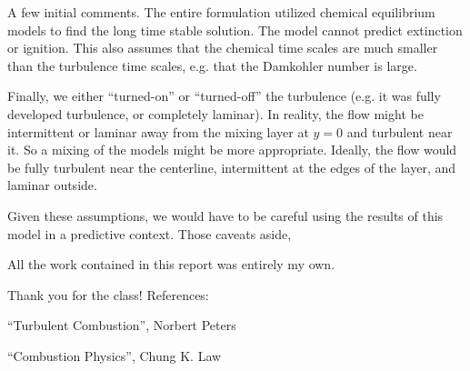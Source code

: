 \documentclass{article}
\begin{document}
A few initial comments. The entire formulation utilized chemical equilibrium models 
to find the long time stable solution. The model cannot predict extinction or ignition. 
This also assumes that the chemical time scales are much smaller than the turbulence 
time scales, e.g. that the Damkohler number is large. 

Finally, we either ``turned-on'' or ``turned-off'' the turbulence
(e.g. it was fully developed turbulence, or completely laminar). In
reality, the flow might be intermittent or laminar away from the mixing
layer at $y=0$ and turbulent near it. So a mixing of the models might be
more appropriate. Ideally, the flow would be fully turbulent near the
centerline, intermittent at the edges of the layer, and laminar outside.  

Given these assumptions, we would have to be careful using the results of 
this model in a predictive context. Those caveats aside, 

\newpage
All the work contained in this report was entirely my own. 

Thank you for the class! 
\vspace{1in}
\newline
References:

``Turbulent Combustion'', Norbert Peters

``Combustion Physics'', Chung K. Law
\end{document}
